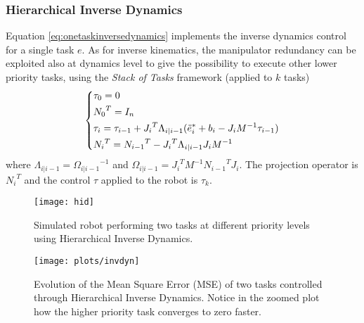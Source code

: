 \subsubsection{Hierarchical Inverse Dynamics}
Equation \eqref{eq:onetaskinversedynamics} implements the inverse dynamics control for a single task $e$. As for inverse kinematics, the manipulator redundancy can be exploited also at dynamics level to give the possibility to execute other lower priority tasks, using the \textit{Stack of Tasks} framework (applied to $k$ tasks)
\begin{equation}
\begin{dcases}
\tau_0 = 0\\
{N_0}^T = I_n\\
\tau_i = \tau_{i-1} + {J_i}^T\Lambda_{i\vert i-1}({\ddot{e}_i}^* + b_i - J_{i}M^{-1}\tau_{i-1}) \\
{N_i}^T = {N_{i-1}}^T - {J_i}^T\Lambda_{i\vert i-1}J_{i}M^{-1}
\end{dcases}
\end{equation}
where $\Lambda_{i\vert i-1} = {\Omega_{i\vert i-1}}^{-1}$ and ${\Omega_{i\vert i-1}} = {J_i}^{T}M^{-1}{N_{i-1}}^TJ_i$. The projection operator is ${N_i}^T$ and the control $\tau$ applied to the robot is $\tau_k$.
\begin{figure}[H]
\centering
\texttt{[image: hid]}
\caption{Simulated robot performing two tasks at different priority levels using Hierarchical Inverse Dynamics.}
\end{figure}
\begin{figure}[H]
\centering
\texttt{[image: plots/invdyn]}
\caption[Evolution of the Mean Square Error (MSE) of two tasks controlled through Hierarchical Inverse Dynamics.]{Evolution of the Mean Square Error (MSE) of two tasks controlled through Hierarchical Inverse Dynamics. Notice in the zoomed plot how the higher priority task converges to zero faster.}
\end{figure}
